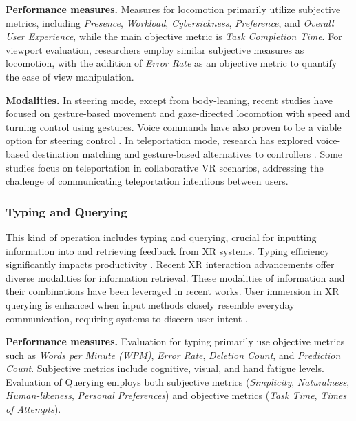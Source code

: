 \documentclass[review]{fcs}
\begin{document}
\textbf{Performance measures.} Measures for locomotion primarily utilize subjective metrics, including \textit{Presence}, \textit{Workload}, \textit{Cybersickness}, \textit{Preference}, and \textit{Overall User Experience}, while the main objective metric is \textit{Task Completion Time}. For viewport evaluation, researchers employ similar subjective measures as locomotion, with the addition of \textit{Error Rate} as an objective metric to quantify the ease of view manipulation.


\textbf{Modalities.} In steering mode, except from body-leaning, recent studies have focused on gesture-based movement \cite{DBLP:conf/vr/SinJLLLN24} and gaze-directed locomotion with speed and turning control using gestures\cite{10.1145/3613904.3642147}. Voice commands have also proven to be a viable option for steering control \cite{DBLP:conf/vr/HombeckVHDL23}. In teleportation mode, research has explored voice-based destination matching \cite{DBLP:conf/vr/HombeckVHDL23} and gesture-based alternatives to controllers \cite{DBLP:conf/vr/SindhupathirajaUDH24}. Some studies focus on teleportation in collaborative VR scenarios, addressing the challenge of communicating teleportation intentions between users\cite{DBLP:conf/chi/RaschRS023}.



\subsubsection{Typing and Querying}
This kind of operation includes typing and querying, crucial for inputting information into and retrieving feedback from XR systems. Typing efficiency significantly impacts productivity \cite{DBLP:conf/chi/HeLP22}. Recent XR interaction advancements offer diverse modalities for information retrieval\cite{DBLP:journals/imwut/WangSWYYWJXY24}. These modalities of information and their combinations have been leveraged in recent works\cite{DBLP:journals/imwut/WangSWYYWJXY24, DBLP:conf/chi/0005WBCRF24}.  User immersion in XR querying is enhanced when input methods closely resemble everyday communication, requiring systems to discern user intent \cite{DBLP:conf/chi/0005WBCRF24}.


\textbf{Performance measures.} Evaluation for typing primarily use objective metrics such as \textit{Words per Minute (WPM)}, \textit{Error Rate}, \textit{Deletion Count}, and \textit{Prediction Count}. Subjective metrics include cognitive, visual, and hand fatigue levels. Evaluation of Querying employs both subjective metrics (\textit{Simplicity}, \textit{Naturalness}, \textit{Human-likeness}, \textit{Personal Preferences}) and objective metrics (\textit{Task Time}, \textit{Times of Attempts}).
\end{document}
